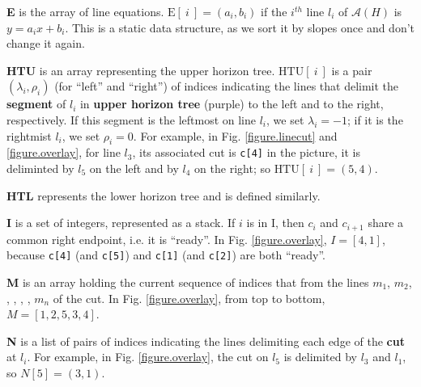 \documentclass[12pt]{article}
\begin{document}
        \begin{description}
            \item{\textbf{E\big[1:n\big]}} is the array of line equations. $\text{E}[\ i\ ]=(a_{i}, b_{i})$ if the $i^{th}$ line $l_{i}$ of $\mathscr{A}(H)$ is $y=a_{i}x+b_{i}$. This is a static data structure, as we sort it by slopes once and don't change it again.
            
            \item{\textbf{HTU\big[1:n\big]}} is an array representing the upper horizon tree. $\text{HTU}[\ i\ ]$ is a pair $(\lambda_{i}, \rho_{i})$ (for ``left'' and ``right'') of indices indicating the lines that delimit the \textbf{segment} of $l_{i}$ in \textbf{upper horizon tree} (purple) to the left and to the right, respectively. If this segment is the leftmost on line $l_i$, we set $\lambda_i = -1$; if it is the rightmist $l_i$, we set $\rho_i = 0$. For example, in Fig. \ref{figure.linecut} and \ref{figure.overlay}, for line $l_3$, its associated cut is \texttt{c[4]} in the picture, it is deliminted by $l_5$ on the left and by $l_4$ on the right; so $\text{HTU}[\ i\ ] = (5, 4)$. 

            \item{\textbf{HTL\big[1:n\big]}} represents the lower horizon tree and is defined similarly.

            \item{\textbf{I}} is a set of integers, represented as a stack. If $i$ is in I, then $c_{i}$ and $c_{i+1}$ share a common right endpoint, i.e. it is ``ready''. In Fig. \ref{figure.overlay}, $I = [4, 1]$, because \texttt{c[4]} (and \texttt{c[5]}) and \texttt{c[1]} (and \texttt{c[2]}) are both ``ready''.
            
            

            \item{\textbf{M\big[1:n\big]}} is an array holding the current sequence of indices that from the lines $m_{1}$, $m_{2}$,  ,  ,  ,  , $m_{n}$ of the cut. In Fig. \ref{figure.overlay}, from top to bottom, $M = [1, 2, 5, 3, 4]$.
            
            \item{\textbf{N\big[1:n\big]}} is a list of pairs of indices indicating the lines delimiting each edge of the \textbf{cut} at $l_i$. For example, in Fig. \ref{figure.overlay}, the cut on $l_5$ is delimited by $l_3$ and $l_1$, so $N[5] = (3, 1)$.

        \end{description}
\end{document}
